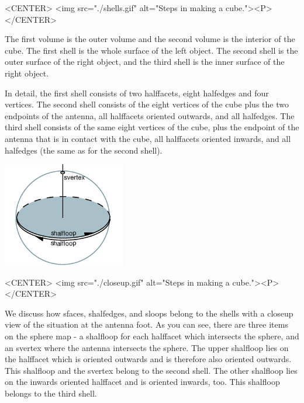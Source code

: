 \begin{ccHtmlOnly}
    <CENTER>
        <img src="./shells.gif" alt="Steps in making a cube."><P>
    </CENTER>
\end{ccHtmlOnly}


The first volume is the outer volume and the second volume is the
interior of the cube. The first shell is the whole surface of the left
object. The second shell is the outer surface of the right object, and
the third shell is the inner surface of the right object. 

In detail, the first shell consists of two halffacets, eight halfedges
and four vertices. The second shell consists of the eight vertices of
the cube plus the two endpoints of the antenna, all halffacets
oriented outwards, and all halfedges. The third shell consists of the
same eight vertices of the cube, plus the endpoint of the antenna
that is in contact with the cube, all halffacets
oriented inwards, and all halfedges (the same as for the second shell).

\begin{ccTexOnly}
    \begin{center}
      \parbox{0.4\textwidth}{%
          \includegraphics[width=0.4\textwidth]{Nef_3/fig/closeup}%
      }
    \end{center}
\end{ccTexOnly}

\begin{ccHtmlOnly}
    <CENTER>
        <img src="./closeup.gif" alt="Steps in making a cube."><P>
    </CENTER>
\end{ccHtmlOnly}

We discuss how sfaces, shalfedges, and sloops belong to the shells
with a closeup view of the situation at the antenna foot. As you can
see, there are three items on the sphere map - a shalfloop for each
halffacet which intersects the sphere, and an svertex where the
antenna intersects the sphere. The upper shalfloop lies on the 
halffacet which is oriented outwards and is therefore also 
oriented outwards. This shalfloop and the svertex belong to the
second shell.
The other shalfloop lies on the inwards oriented halffacet and is 
oriented inwards, too. This shalfloop belongs to the third shell. 

